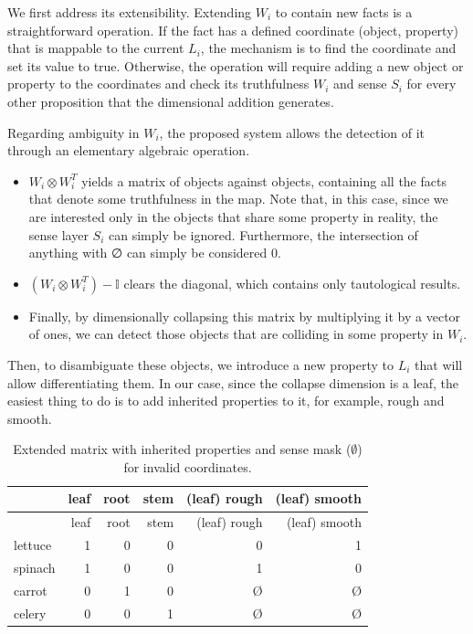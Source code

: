 \documentclass{article}
\begin{document}
We first address its extensibility. Extending \(W_i\) to contain new
facts is a straightforward operation. If the fact has a defined
coordinate (object, property) that is mappable to the current \(L_i\),
the mechanism is to find the coordinate and set its value to true.
Otherwise, the operation will require adding a new object or property to
the coordinates and check its truthfulness \(W_i\) and sense \(S_i\) for
every other proposition that the dimensional addition generates.

Regarding ambiguity in \(W_i\), the proposed system allows the detection
of it through an elementary algebraic operation.

\begin{itemize}
\item
  \(W_i \otimes W^T_i\) yields a matrix of objects against objects,
  containing all the facts that denote some truthfulness in the map.
  Note that, in this case, since we are interested only in the objects
  that share some property in reality, the sense layer \(S_i\) can
  simply be ignored. Furthermore, the intersection of anything with ∅
  can simply be considered 0.
\item
  \((W_i \otimes W^T_i) - \mathbb{I}\) clears the diagonal, which
  contains only tautological results.
\item
  Finally, by dimensionally collapsing this matrix by multiplying it by
  a vector of ones, we can detect those objects that are colliding in
  some property in \(W_i\).
\end{itemize}

Then, to disambiguate these objects, we introduce a new property to
\(L_i\) that will allow differentiating them. In our case, since the
collapse dimension is a leaf, the easiest thing to do is to add
inherited properties to it, for example, rough and smooth.

\begin{longtable}[]{@{}lrrrrr@{}}
\caption{Extended matrix with inherited properties and sense mask
(\(\emptyset\)) for invalid coordinates.}\tabularnewline
\toprule
& leaf & root & stem & (leaf) rough & (leaf) smooth \\
\midrule
\endfirsthead
\toprule
& leaf & root & stem & (leaf) rough & (leaf) smooth \\
\midrule
\endhead
lettuce & 1 & 0 & 0 & 0 & 1 \\
spinach & 1 & 0 & 0 & 1 & 0 \\
carrot & 0 & 1 & 0 & Ø & Ø \\
celery & 0 & 0 & 1 & Ø & Ø \\
\bottomrule
\end{longtable}
\end{document}

